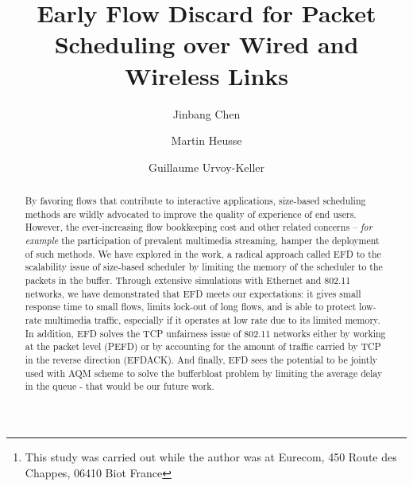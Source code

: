 \documentclass[preprint,12pt]{elsarticle}
\begin{document}
\begin{frontmatter}



\title{Early Flow Discard for Packet Scheduling over Wired and Wireless Links}


\author[*]{Jinbang Chen}
\author[**]{Martin Heusse}
\author[***]{Guillaume Urvoy-Keller}
\address[*]{East China Normal University, China\footnote{This study was carried out while the author was at Eurecom, 450 Route des Chappes, 06410 Biot France}}
\address[**]{Laboratoire LIG CNRS UMR 5217, Grenoble, France}
\address[***]{Univ. Nice Sophia Antipolis, CNRS, I3S, UMR 7271, 06900 Sophia Antipolis, France}
\begin{abstract}
By favoring flows that contribute to interactive applications, size-based scheduling methods are wildly advocated to improve the quality of experience of end users. However, the ever-increasing flow bookkeeping cost and other related concerns -- \textit{for example} the participation of prevalent multimedia streaming, hamper the deployment of such methods. We have explored in the work, a radical approach called EFD to the scalability issue of size-based scheduler by limiting the memory of the scheduler to the packets in the buffer. Through extensive simulations with Ethernet and 802.11 networks, we have demonstrated that EFD meets our expectations: it gives small response time to small flows, limits lock-out of long flows, and is able to protect low-rate multimedia traffic, especially if it operates at low rate due to its limited memory. In addition, EFD solves the TCP unfairness issue of 802.11 networks either by working at the packet level (PEFD) or by accounting for the amount of traffic carried by TCP in the reverse direction (EFDACK). And finally, EFD sees the potential to be jointly used with AQM scheme to solve the bufferbloat problem by limiting the average delay in the queue - that would be our future work.
\end{abstract}


\end{frontmatter}
\end{document}
